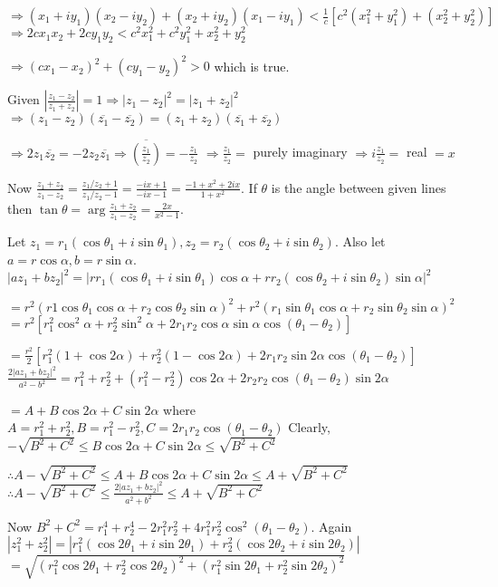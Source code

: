  $\Rightarrow (x_1 + iy_1)(x_2 - iy_2) + (x_2 + iy_2)(x_1 - iy_1) < \frac{1}{c}[c^2(x_1^2 + y_1^2) + (x_2^2 + y_2^2)]$
  $\Rightarrow 2cx_1x_2 + 2cy_1y_2 < c^2x_1^2 + c^2y_1^2 + x_2^2 + y_2^2$

  $\Rightarrow (cx_1 - x_2)^2 + (cy_1 - y_2)^2 > 0$ which is true.
\item Given $\left|\frac{z_1 - z_2}{z_1 + z_2}\right| = 1 \Rightarrow |z_1 - z_2|^2 = |z_1 + z_2|^2$
  $\Rightarrow (z_1 - z_2)(\overline{z_1} - \overline{z_2}) = (z_1 + z_2)(\overline{z_1} + \overline{z_2})$

  $\Rightarrow 2z_1\overline{z_2} = -2z_2\overline{z_1} \Rightarrow \overline{\left(\frac{z_1}{z_2}\right)}
  = -\frac{z_1}{z_2}$ $\Rightarrow \frac{z_1}{z_2} = $ purely imaginary $\Rightarrow i\frac{z_1}{z_2} =$
  real $= x$

  Now $\frac{z_1 + z_2}{z_1 - z_2} = \frac{z_1/z_2 + 1}{z_1/z_2 - 1} = \frac{-ix + 1}{-ix - 1} = \frac{-1 +
    x^2 + 2ix}{1 + x^2}$. If $\theta$ is the angle between given lines then
  $\tan\theta = \arg\frac{z_1 + z_2}{z_1 - z_2} = \frac{2x}{x^2 - 1}$.
\item Let $z_1 = r_1(\cos\theta_1 + i\sin\theta_1), z_2 = r_2(\cos\theta_2 + i\sin\theta_2)$. Also let $a =
  r\cos\alpha, b = r\sin\alpha$.
  $|az_1 + bz_2|^2 = |rr_1(\cos\theta_1 + i\sin\theta_1)\cos\alpha + rr_2(\cos\theta_2 + i\sin\theta_2)\sin\alpha|^2$

  $= r^2(r1\cos\theta_1\cos\alpha + r_2\cos\theta_2\sin\alpha)^2 + r^2(r_1\sin\theta_1\cos\alpha + r_2\sin\theta_2\sin\alpha)^2$
  $= r^2[r_1^2\cos^2\alpha + r_2^2\sin^2\alpha + 2r_1r_2\cos\alpha\sin\alpha\cos(\theta_1 - \theta_2)]$

  $= \frac{r^2}{2}[r_1^2(1 + \cos2\alpha) + r_2^2(1 - \cos2\alpha) + 2r_1r_2\sin2\alpha\cos(\theta_1 - \theta_2)]$
  $\frac{2|az_1 + bz_2|^2}{a^2 - b^2}= r_1^2 + r_2^2 + (r_1^2 - r_2^2)\cos2\alpha + 2r_2r_2\cos(\theta_1 - \theta_2)\sin2\alpha$

  $= A + B\cos2\alpha + C\sin2\alpha$ where $A = r_1^2 + r_2^2, B = r_1^2- r_2^2, C = 2r_1r_2\cos(\theta_1 - \theta_2)$
  Clearly, $-\sqrt{B^2 + C^2}\leq B\cos2\alpha + C\sin2\alpha \leq \sqrt{B^2 + C^2}$

  $\therefore A -\sqrt{B^2 + C^2}\leq A + B\cos2\alpha + C\sin2\alpha \leq A + \sqrt{B^2 + C^2}$
  $\therefore A -\sqrt{B^2 + C^2}\leq  \frac{2|az_1 + bz_2|^2}{a^2 + b^2}\leq A + \sqrt{B^2 + C^2}$

  Now $B^2 + C^2 = r_1^4 + r_2^4 - 2r_1^2r_2^2 + 4r_1^2r_2^2\cos^2(\theta_1 - \theta_2)$.
  Again $|z_1^2 + z_2^2| = |r_1^2(\cos2\theta_1 + i\sin2\theta_1) + r_2^2(\cos2\theta_2 + i\sin2\theta_2)|$
  $= \sqrt{(r_1^2\cos2\theta_1 + r_2^2\cos2\theta_2)^2 + (r_1^2\sin2\theta_1 + r_2^2\sin2\theta_2)^2}$

